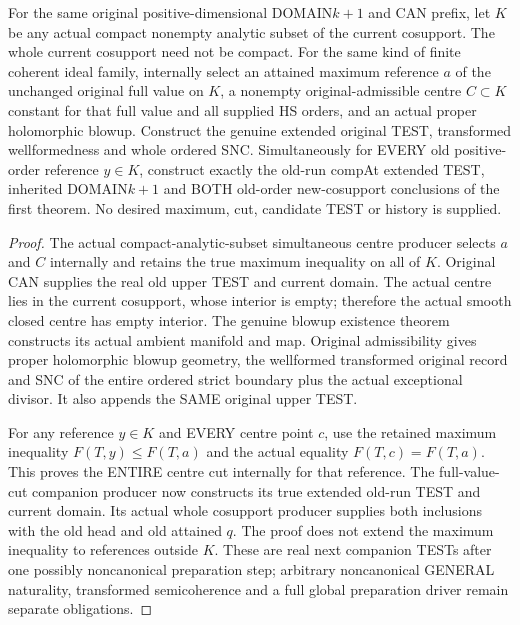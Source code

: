 \begin{theorem}
\label{hir:original-compact-analytic-subset-simultaneous-companion-next-test}
\leanok
For the same original positive-dimensional DOMAIN$k+1$ and CAN prefix,
let $K$ be any actual compact nonempty analytic subset of the current
cosupport. The whole current cosupport need not be compact. For the same
kind of finite coherent ideal family, internally select an attained
maximum reference $a$ of the unchanged original full value on $K$, a
nonempty original-admissible centre $C\subset K$ constant for that full
value and all supplied HS orders, and an actual proper holomorphic
blowup. Construct the genuine extended original TEST, transformed
wellformedness and whole ordered SNC. Simultaneously for EVERY old
positive-order reference $y\in K$, construct exactly the old-run compAt
extended TEST, inherited DOMAIN$k+1$ and BOTH old-order new-cosupport
conclusions of the first theorem. No desired maximum, cut, candidate
TEST or history is supplied.
\end{theorem}
\begin{proof}
The actual compact-analytic-subset simultaneous centre producer selects
$a$ and $C$ internally and retains the true maximum inequality on all of
$K$. Original CAN supplies the real old upper TEST and current domain.
The actual centre lies in the current cosupport, whose interior is empty;
therefore the actual smooth closed centre has empty interior. The genuine
blowup existence theorem constructs its actual ambient manifold and map.
Original admissibility gives proper holomorphic blowup geometry, the
wellformed transformed original record and SNC of the entire ordered
strict boundary plus the actual exceptional divisor. It also appends the
SAME original upper TEST.

For any reference $y\in K$ and EVERY centre point $c$, use the retained
maximum inequality $F(T,y)\le F(T,a)$ and the actual equality
$F(T,c)=F(T,a)$. This proves the ENTIRE centre cut internally for that
reference. The full-value-cut companion producer now constructs its true
extended old-run TEST and current domain. Its actual whole cosupport
producer supplies both inclusions with the old head and old attained
$q$. The proof does not extend the maximum inequality to references
outside $K$. These are real next companion TESTs after one possibly
noncanonical preparation step; arbitrary noncanonical GENERAL naturality,
transformed semicoherence and a full global preparation driver remain
separate obligations.
\end{proof}

